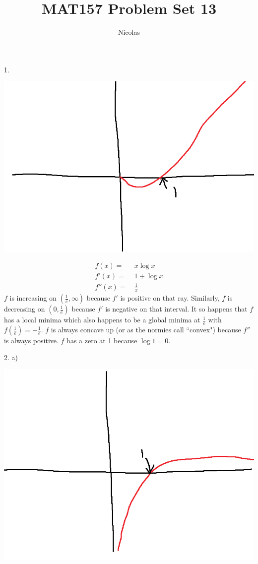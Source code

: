 \documentclass[11pt]{article}
\title{MAT157 Problem Set 13}
\author{Nicolas}
\begin{document}
\maketitle
\begin{flushleft}

1.

\includegraphics[width=\textwidth]{shittyxlogx.png}

\begin{align*}
f(x) = & \ x \log x \\
f'(x) = & \ 1 + \log x \\
f''(x) = & \ \frac{1}{x}
\end{align*}
$f$ is increasing on $(\frac1e, \infty)$ because $f'$ is positive on that ray. Similarly, $f$ is decreasing on $(0, \frac1e)$ because $f'$ is negative on that interval. It so happens that $f$ has a local minima which also happens to be a global minima at $\frac1e$ with $f(\frac1e) = -\frac1e$. $f$ is always concave up (or as the normies call ``convex") because $f''$ is always positive. $f$ has a zero at 1 because $\log 1 = 0$.

\newpage

2. a)

\includegraphics[width=\textwidth]{shittylogxoverx.png}


\end{flushleft}
\end{document}
